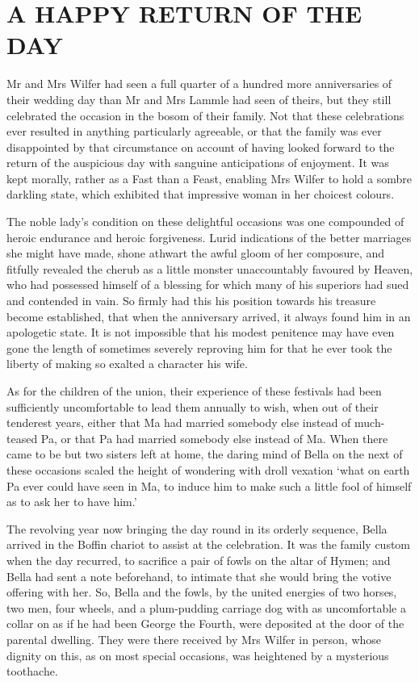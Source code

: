 
\chapter{A HAPPY RETURN OF THE DAY}

Mr and Mrs Wilfer had seen a full quarter of a hundred more
anniversaries of their wedding day than Mr and Mrs Lammle had seen of
theirs, but they still celebrated the occasion in the bosom of
their family. Not that these celebrations ever resulted in anything
particularly agreeable, or that the family was ever disappointed by that
circumstance on account of having looked forward to the return of the
auspicious day with sanguine anticipations of enjoyment. It was kept
morally, rather as a Fast than a Feast, enabling Mrs Wilfer to hold
a sombre darkling state, which exhibited that impressive woman in her
choicest colours.

The noble lady’s condition on these delightful occasions was one
compounded of heroic endurance and heroic forgiveness. Lurid indications
of the better marriages she might have made, shone athwart the awful
gloom of her composure, and fitfully revealed the cherub as a little
monster unaccountably favoured by Heaven, who had possessed himself of a
blessing for which many of his superiors had sued and contended in vain.
So firmly had this his position towards his treasure become established,
that when the anniversary arrived, it always found him in an apologetic
state. It is not impossible that his modest penitence may have even gone
the length of sometimes severely reproving him for that he ever took the
liberty of making so exalted a character his wife.

As for the children of the union, their experience of these festivals
had been sufficiently uncomfortable to lead them annually to wish, when
out of their tenderest years, either that Ma had married somebody else
instead of much-teased Pa, or that Pa had married somebody else instead
of Ma. When there came to be but two sisters left at home, the daring
mind of Bella on the next of these occasions scaled the height of
wondering with droll vexation ‘what on earth Pa ever could have seen in
Ma, to induce him to make such a little fool of himself as to ask her to
have him.’

The revolving year now bringing the day round in its orderly sequence,
Bella arrived in the Boffin chariot to assist at the celebration. It was
the family custom when the day recurred, to sacrifice a pair of fowls
on the altar of Hymen; and Bella had sent a note beforehand, to intimate
that she would bring the votive offering with her. So, Bella and the
fowls, by the united energies of two horses, two men, four wheels, and a
plum-pudding carriage dog with as uncomfortable a collar on as if he
had been George the Fourth, were deposited at the door of the parental
dwelling. They were there received by Mrs Wilfer in person, whose
dignity on this, as on most special occasions, was heightened by a
mysterious toothache.

